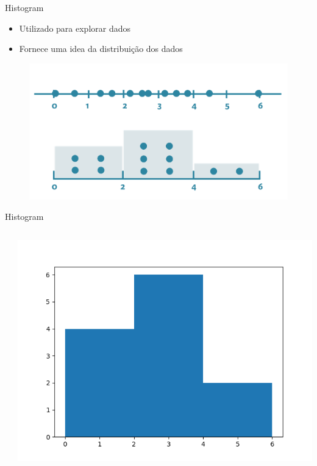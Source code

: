 \begin{frame}[t, fragile]{Histogram}
  \begin{itemize}
    \item Utilizado para explorar dados
    \item Fornece uma idea da distribuição dos dados
  \end{itemize}
  \begin{figure}
    \includegraphics[scale=.40]{aula-2/figuras/matplotlib-histogram-a.png}
  \end{figure}

\end{frame}
%
\begin{frame}[t, fragile]{Histogram}
  \begin{columns}
    \begin{column}{0.5\textwidth}
          
    \end{column}

    \begin{column}{0.5\textwidth}
      \begin{center}
        \includegraphics[scale=.40]{aula-2/figuras/matplotlib-histogram-1.png}
      \end{center}
    \end{column}
  \end{columns}
\end{frame}
%

 